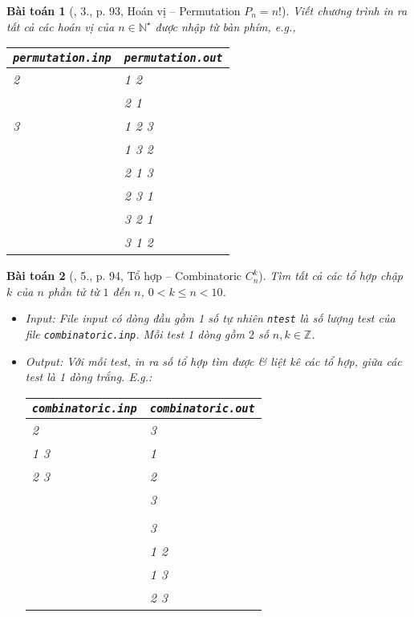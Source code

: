 \documentclass{article}
\newtheorem{baitoan}{Bài toán}
\begin{document}
\begin{baitoan}[\cite{VietSTEM2021}, 3., p. 93, Hoán vị -- Permutation $P_n = n!$]
	Viết chương trình in ra tất cả các hoán vị của $n\in\mathbb{N}^\star$ được nhập từ bàn phím, e.g.,
	\begin{table}[H]
		\centering
		\begin{tabular}{|l|l|}
			\hline
			\texttt{permutation.inp} & \texttt{permutation.out} \\
			\hline
			2 & 1 2 \\
			& 2 1 \\
			\hline
			3 & 1 2 3 \\
			& 1 3 2 \\
			& 2 1 3 \\
			& 2 3 1 \\
			& 3 2 1 \\
			& 3 1 2 \\
			\hline
		\end{tabular}
	\end{table}
\end{baitoan}

\begin{baitoan}[\cite{VietSTEM2021}, 5., p. 94, Tổ hợp -- Combinatoric $C_n^k$]
	Tìm tất cả các tổ hợp chập $k$ của $n$ phần tử từ $1$ đến $n$, $0 < k\le n < 10$.
	\begin{itemize}
		\item {\sf Input:} File input có dòng đầu gồm 1 số tự nhiên \texttt{ntest} là số lượng test của file \verb|combinatoric.inp|. Mỗi test 1 dòng gồm $2$ số $n,k\in\mathbb{Z}$. 
		\item {\sf Output:} Với mỗi test, in ra số tổ hợp tìm được \& liệt kê các tổ hợp, giữa các test là 1 dòng trắng. E.g.:
		\begin{table}[H]
			\centering
			\begin{tabular}{|l|l|}
				\hline
				\texttt{combinatoric.inp} & \texttt{combinatoric.out} \\
				\hline
				2 & 3 \\
				1 3 & 1 \\
				2 3 & 2 \\
				& 3 \\
				& \\
				& 3 \\
				& 1 2 \\
				& 1 3 \\
				& 2 3 \\
				\hline
			\end{tabular}
		\end{table}
	\end{itemize}
\end{baitoan}
\end{document}
